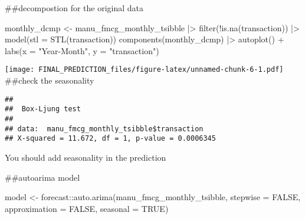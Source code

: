 \documentclass[
]{article}
\newenvironment{Shaded}{\begin{snugshade}}{\end{snugshade}}
\newcommand{\AttributeTok}[1]{\textcolor[rgb]{0.77,0.63,0.00}{#1}}
\newcommand{\ConstantTok}[1]{\textcolor[rgb]{0.00,0.00,0.00}{#1}}
\newcommand{\FunctionTok}[1]{\textcolor[rgb]{0.00,0.00,0.00}{#1}}
\newcommand{\NormalTok}[1]{#1}
\newcommand{\OtherTok}[1]{\textcolor[rgb]{0.56,0.35,0.01}{#1}}
\newcommand{\SpecialCharTok}[1]{\textcolor[rgb]{0.00,0.00,0.00}{#1}}
\newcommand{\StringTok}[1]{\textcolor[rgb]{0.31,0.60,0.02}{#1}}
\begin{document}
\#\#decompostion for the original data

\begin{Shaded}
\begin{Highlighting}[]
\NormalTok{monthly\_dcmp }\OtherTok{\textless{}{-}}\NormalTok{ manu\_fmcg\_monthly\_tsibble }\SpecialCharTok{|\textgreater{}} \FunctionTok{filter}\NormalTok{(}\SpecialCharTok{!}\FunctionTok{is.na}\NormalTok{(transaction)) }\SpecialCharTok{|\textgreater{}}
                \FunctionTok{model}\NormalTok{(}\AttributeTok{stl =} \FunctionTok{STL}\NormalTok{(transaction))}
\FunctionTok{components}\NormalTok{(monthly\_dcmp) }\SpecialCharTok{|\textgreater{}} \FunctionTok{autoplot}\NormalTok{() }\SpecialCharTok{+} \FunctionTok{labs}\NormalTok{(}\AttributeTok{x =} \StringTok{"Year{-}Month"}\NormalTok{, }\AttributeTok{y =} \StringTok{"transaction"}\NormalTok{)}
\end{Highlighting}
\end{Shaded}

\texttt{[image: FINAL\_PREDICTION\_files/figure-latex/unnamed-chunk-6-1.pdf]}
\#\#check the seasonality

\begin{Shaded}
\end{Shaded}

\begin{verbatim}
## 
##  Box-Ljung test
## 
## data:  manu_fmcg_monthly_tsibble$transaction
## X-squared = 11.672, df = 1, p-value = 0.0006345
\end{verbatim}

You should add seasonality in the prediction

\#\#autoarima model

\begin{Shaded}
\begin{Highlighting}[]
\NormalTok{model }\OtherTok{\textless{}{-}}\NormalTok{ forecast}\SpecialCharTok{::}\FunctionTok{auto.arima}\NormalTok{(manu\_fmcg\_monthly\_tsibble, }\AttributeTok{stepwise =} \ConstantTok{FALSE}\NormalTok{, }\AttributeTok{approximation =} \ConstantTok{FALSE}\NormalTok{, }\AttributeTok{seasonal =} \ConstantTok{TRUE}\NormalTok{)}
\end{Highlighting}
\end{Shaded}
\end{document}
